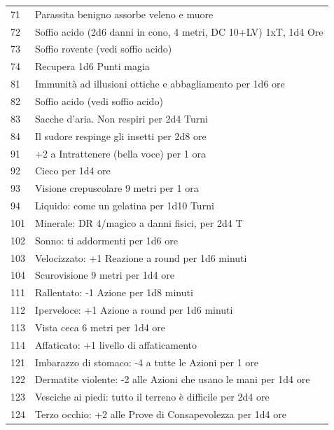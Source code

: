 \begin{multicols}{2}
\begin{tabularx}{\linewidth}{lX}
\toprule
71 & Parassita benigno assorbe veleno e muore \\
\rowcolor{gray!20}72 & Soffio acido (2d6 danni in cono, 4 metri, DC 10+LV) 1xT, 1d4 Ore\\
73 & Soffio rovente (vedi soffio acido)\\
\rowcolor{gray!20}74 & Recupera 1d6 Punti magia \\
81 & Immunità ad illusioni ottiche e abbagliamento per 1d6 ore\\
\rowcolor{gray!20}82 & Soffio acido (vedi soffio acido)\\
83 & Sacche d'aria. Non respiri per 2d4 Turni\\
\rowcolor{gray!20}84 & Il sudore respinge gli insetti per 2d8 ore \\
91 & +2 a Intrattenere (bella voce) per 1 ora \\
\rowcolor{gray!20}92 & Cieco per 1d4 ore\\
93 & Visione crepuscolare 9 metri per 1 ora \\
\rowcolor{gray!20}94 & Liquido: come un gelatina per 1d10 Turni\\
101 & Minerale: DR 4/magico a danni fisici, per 2d4 T\\
\rowcolor{gray!20}102 & Sonno: ti addormenti per 1d6 ore\\
103 & Velocizzato: +1 Reazione a round per 1d6 minuti\\
\rowcolor{gray!20}104 & Scurovisione 9 metri per 1d4 ore\\
111 & Rallentato: -1 Azione per 1d8 minuti\\
\rowcolor{gray!20}112 & Iperveloce: +1 Azione a round per 1d6 minuti \\
113 & Vista ceca 6 metri per 1d4 ore \\
\rowcolor{gray!20}114 & Affaticato: +1 livello di affaticamento\\
121 & Imbarazzo di stomaco: -4 a tutte le Azioni per 1 ore\\
\rowcolor{gray!20}122 & Dermatite violente: -2 alle Azioni che usano le mani per 1d4 ore\\
123 & Vesciche ai piedi: tutto il terreno è difficile per 2d4 ore\\
\rowcolor{gray!20}124 & Terzo occhio: +2 alle Prove di Consapevolezza per 1d4 ore\\
\end{tabularx}


\end{multicols}

\vfill


